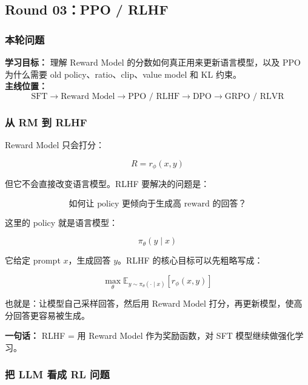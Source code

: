 
\subsection{Round 03：PPO / RLHF}

\subsubsection{本轮问题}

\begin{conceptbox}
\textbf{学习目标：} 理解 Reward Model 的分数如何真正用来更新语言模型，以及 PPO 为什么需要 old policy、ratio、clip、value model 和 KL 约束。\\
\textbf{主线位置：}
\[
\text{SFT} \to \text{Reward Model} \to \text{PPO / RLHF} \to \text{DPO} \to \text{GRPO / RLVR}
\]
\end{conceptbox}

\subsubsection{从 RM 到 RLHF}

Reward Model 只会打分：

\[
R = r_\phi(x, y)
\]

但它不会直接改变语言模型。RLHF 要解决的问题是：

\[
\text{如何让 policy 更倾向于生成高 reward 的回答？}
\]

这里的 policy 就是语言模型：

\[
\pi_\theta(y \mid x)
\]

它给定 prompt $x$，生成回答 $y$。RLHF 的核心目标可以先粗略写成：

\[
\max_\theta \mathbb{E}_{y \sim \pi_\theta(\cdot \mid x)}
\left[
r_\phi(x, y)
\right]
\]

也就是：让模型自己采样回答，然后用 Reward Model 打分，再更新模型，使高分回答更容易被生成。

\begin{summarybox}
\textbf{一句话：} RLHF = 用 Reward Model 作为奖励函数，对 SFT 模型继续做强化学习。
\end{summarybox}

\subsubsection{把 LLM 看成 RL 问题}

